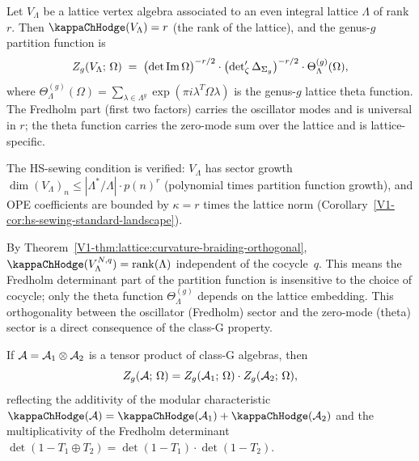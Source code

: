\begin{example}%
%
Let $V_\Lambda$ be a lattice vertex algebra associated to an
even integral lattice $\Lambda$ of rank $r$. Then
$\kappaChHodge(V_\Lambda) = r$ (the rank of the lattice), and the
genus-$g$ partition function is
\begin{equation}%
Z_g(V_\Lambda;\,\Omega)
\;=\;
\bigl(\det\operatorname{Im}\Omega\bigr)^{-r/2}
\cdot
\bigl(\zetareg\Delta_{\Sigma_g}\bigr)^{-r/2}
\cdot
\Theta_\Lambda^{(g)}(\Omega),
\end{equation}
where $\Theta_\Lambda^{(g)}(\Omega)
= \sum_{\lambda \in \Lambda^g}
\exp(\pi i \lambda^T \Omega \lambda)$ is the genus-$g$
lattice theta function. The Fredholm part (first two factors)
carries the oscillator modes and is universal in $r$;
the theta function carries the zero-mode sum over the
lattice and is lattice-specific.

The HS-sewing condition is verified: $V_\Lambda$ has sector
growth $\dim (V_\Lambda)_n \leq |\Lambda^*/\Lambda| \cdot p(n)^r$
(polynomial times partition function growth), and OPE
coefficients are bounded by $\kappa = r$ times the lattice
norm (Corollary~\ref{V1-cor:hs-sewing-standard-landscape}).
\end{example}

\begin{remark}%
%
By Theorem~\ref{V1-thm:lattice:curvature-braiding-orthogonal},
$\kappaChHodge(V_\Lambda^{N,q}) = \mathrm{rank}(\Lambda)$
independent of the cocycle~$q$. This means the Fredholm
determinant part of the partition function is insensitive to
the choice of cocycle; only the theta function
$\Theta_\Lambda^{(g)}$ depends on the lattice embedding.
This orthogonality between the oscillator (Fredholm) sector
and the zero-mode (theta) sector is a direct consequence of
the class-G property.
\end{remark}

\begin{proposition}%
%
If $\mathcal{A} = \mathcal{A}_1 \otimes \mathcal{A}_2$ is a tensor product of
class-G algebras, then
\begin{equation}%
Z_g(\cA;\,\Omega)
= Z_g(\cA_1;\,\Omega)
\cdot Z_g(\cA_2;\,\Omega),
\end{equation}
reflecting the additivity of the modular characteristic
$\kappaChHodge(\cA) = \kappaChHodge(\cA_1) + \kappaChHodge(\cA_2)$
and the multiplicativity of the Fredholm determinant
$\det(1 - T_1 \oplus T_2)
= \det(1 - T_1) \cdot \det(1 - T_2)$.
\end{proposition}

